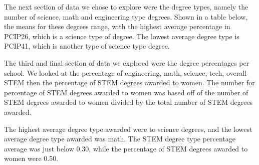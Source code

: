 \documentclass[11pt,english]{article}
\begin{document}
The next section of data we chose to explore were the degree types, namely the number of science, math and engineering type degrees. Shown in a table below, the means for these degrees range, with the highest average percentage in PCIP26, which is a science type of degree. The lowest average degree type is PCIP41, which is another type of science type degree.

\begin{table}[ht]
\centering
{}
\caption{Degree Type Summary Statistics} 
\end{table}
The third and final section of data we explored were the degree percentages per school. We looked at the percentage of engineering, math, science, tech, overall STEM then the percentage of STEM degrees awarded to women. The number for percentage of STEM degrees awarded to women was based off of the number of STEM degrees awarded to women divided by the total number of STEM degrees awarded.

The highest average degree type awarded were to science degrees, and the lowest average degree type awarded was math. The STEM degree type percentage average was just below 0.30, while the percentage of STEM degrees awarded to women were 0.50. 
\end{document}
